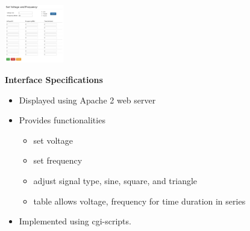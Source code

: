 \documentclass[25pt, a0paper, portrait, margin=0mm, innermargin=15mm, blockverticalspace=15mm, colspace=15mm, subcolspace=8mm]{tikzposter}
\begin{document}
\begin{columns}
{\begin{multicols}{2}
\end{multicols}
}

{
\begin{multicols}{2}


\begin{center}
\includegraphics[width=0.2\textwidth,keepaspectratio]{web_interface.pdf}
\end{center}

\textbf{Interface Specifications}
\begin{itemize}
\item Displayed using Apache 2 web server 
\item Provides functionalities
\begin{itemize}
\item set voltage
\item set frequency
\item adjust signal type, sine, square, and triangle
\item table allows voltage, frequency for time duration in series
\end{itemize}
\item Implemented using cgi-scripts.
\end{itemize}




\end{multicols}}
\end{columns}
\end{document}
